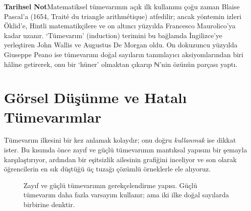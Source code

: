 \begin{tcolorbox}[bookbox,colback=cDef]\textbf{\textsf{\textcolor{cAcc}{Tarihsel Not}}}\quad Matematiksel tümevarımın açık ilk kullanımı çoğu zaman Blaise Pascal’a (1654, Traité du triangle arithmétique) atfedilir; ancak yöntemin izleri Öklid’e, Hintli matematikçilere ve on altıncı yüzyılda Francesco Maurolico’ya kadar uzanır. ‘Tümevarım’ (induction) terimini bu bağlamda İngilizce’ye yerleştiren John Wallis ve Augustus De Morgan oldu. On dokuzuncu yüzyılda Giuseppe Peano ise tümevarımı doğal sayıların tanımlayıcı aksiyomlarından biri hâline getirerek, onu bir ‘hüner’ olmaktan çıkarıp ℕ’nin özünün parçası yaptı.\end{tcolorbox}

\section{Görsel Düşünme ve Hatalı Tümevarımlar}

Tümevarım ilkesini bir kez anlamak kolaydır; onu doğru \emph{kullanmak} ise dikkat ister. Bu kısımda önce zayıf ve güçlü tümevarımın mantıksal yapısını bir şemayla karşılaştırıyor, ardından bir eşitsizlik ailesinin grafiğini inceliyor ve son olarak öğrencilerin en sık düştüğü üç tuzağı çözümlü örneklerle ele alıyoruz.

\begin{figure}[htbp]
\centering
{}%
\caption{Zayıf ve güçlü tümevarımın gerekçelendirme yapısı. Güçlü tümevarım daha fazla varsayım kullanır; ama iki ilke doğal sayılarda birbirine denktir.}
\end{figure}

